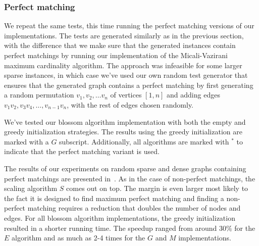 \subsubsection*{Perfect matching}

We repeat the same tests, this time running the perfect matching versions of our implementations. The tests are generated similarly as in the previous section, with the difference that we make sure that the generated instances contain perfect matchings by running our implementation of the Micali-Vazirani maximum cardinality algorithm. The approach was infeasible for some larger sparse instances, in which case we've used our own random test generator that ensures that the generated graph contains a perfect matching by first generating a random permutation $v_1, v_2, \dots v_n$ of vertices $[1, n]$  and adding edges $v_1v_2, v_3v_4, \dots, v_{n-1}v_n$, with the rest of edges chosen randomly.

We've tested our blossom algorithm implementation with both the empty and greedy initialization strategies. The results using the greedy initialization are marked with a $G$ subscript. Additionally, all algorithms are marked with $^*$ to indicate that the perfect matching variant is used.

The results of our experiments on random sparse and dense graphs containing perfect matchings are presented in~. As in the case of non-perfect matchings, the scaling algorithm $S$ comes out on top. The margin is even larger most likely to the fact it is designed to find maximum perfect matching and finding a non-perfect matching requires a reduction that doubles the number of nodes and edges. For all blossom algorithm implementations, the greedy initialization resulted in a shorter running time. The speedup ranged from around $30\%$ for the $E$ algorithm and as much as 2-4 times for the $G$ and $M$ implementations.

